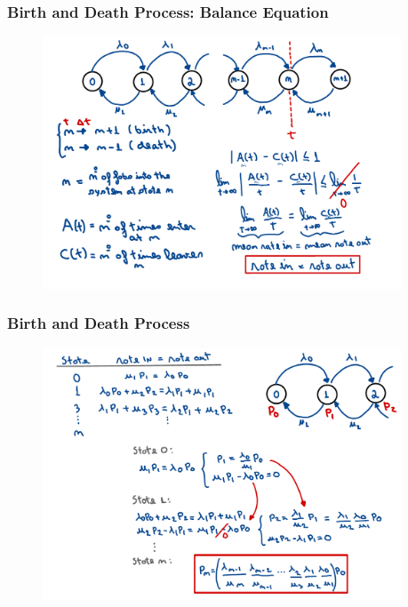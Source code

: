 \begin{frame}
    \frametitle{Birth and Death Process: Balance Equation}
    \begin{figure}
        \centering
        \includegraphics[width=0.95\textwidth]{slides/figures/balance_equation_proof.pdf}
    \end{figure}
\end{frame}


\begin{frame}
    \frametitle{Birth and Death Process}
    \begin{figure}
        \centering
        \includegraphics[width=0.95\textwidth]{slides/figures/balance_equation_prob_n.pdf}
    \end{figure}
\end{frame}


